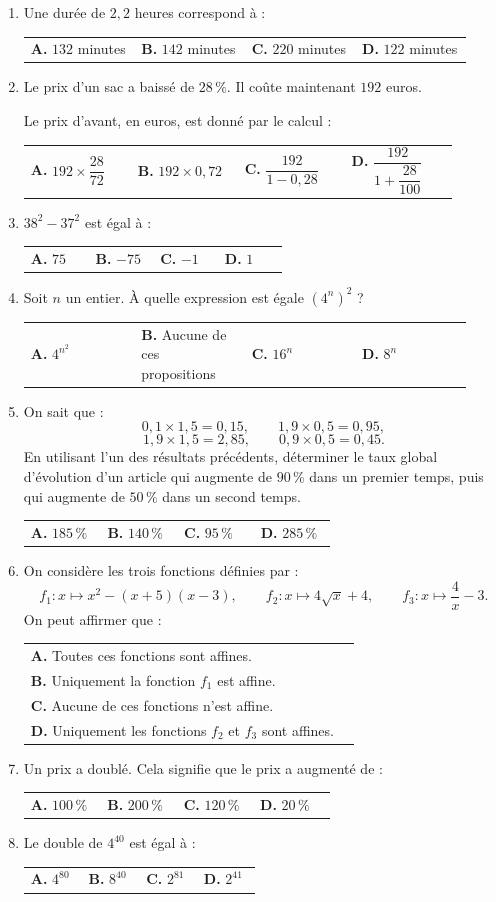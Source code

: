\documentclass[11pt,a4paper]{article}
\makeatletter
\newcommand{\choixquatre}[4]{%
\begin{tabular}{@{}p{0.23\linewidth}p{0.23\linewidth}p{0.23\linewidth}p{0.23\linewidth}@{}}
\textbf{A.} #1 & \textbf{B.} #2 & \textbf{C.} #3 & \textbf{D.} #4
\end{tabular}}
\makeatother
\begin{document}
\begin{enumerate}[label=\textbf{\arabic*)}, leftmargin=0.75cm, itemsep=0.55cm, topsep=0.2cm]

\item Une durée de $2{,}2$ heures correspond à :\par\smallskip
\choixquatre{$132$ minutes}{$142$ minutes}{$220$ minutes}{$122$ minutes}

\item Le prix d'un sac a baissé de $28\,\%$. Il coûte maintenant $192$ euros.\par
Le prix d'avant, en euros, est donné par le calcul :\par\smallskip
\choixquatre{$192\times \dfrac{28}{72}$}{$192\times 0{,}72$}{$\dfrac{192}{1-0{,}28}$}{$\dfrac{192}{1+\dfrac{28}{100}}$}

\item $38^2-37^2$ est égal à :\par\smallskip
\choixquatre{$75$}{$-75$}{$-1$}{$1$}

\item Soit $n$ un entier. À quelle expression est égale $(4^n)^2$ ?\par\smallskip
\choixquatre{$4^{n^2}$}{Aucune de ces propositions}{$16^n$}{$8^n$}

\item On sait que :
\[
0{,}1\times 1{,}5=0{,}15,\qquad 1{,}9\times 0{,}5=0{,}95,
\]
\[
1{,}9\times 1{,}5=2{,}85,\qquad 0{,}9\times 0{,}5=0{,}45.
\]
En utilisant l'un des résultats précédents, déterminer le taux global d'évolution d'un article qui augmente de $90\,\%$ dans un premier temps, puis qui augmente de $50\,\%$ dans un second temps.\par\smallskip
\choixquatre{$185\,\%$}{$140\,\%$}{$95\,\%$}{$285\,\%$}

\item On considère les trois fonctions définies par :
\[
f_1:x\longmapsto x^2-(x+5)(x-3),\qquad
f_2:x\longmapsto 4\sqrt{x}+4,\qquad
f_3:x\longmapsto \frac{4}{x}-3.
\]
On peut affirmer que :\par\smallskip
\begin{tabular}{@{}p{0.96\linewidth}@{}}
\textbf{A.} Toutes ces fonctions sont affines.\\
\textbf{B.} Uniquement la fonction $f_1$ est affine.\\
\textbf{C.} Aucune de ces fonctions n'est affine.\\
\textbf{D.} Uniquement les fonctions $f_2$ et $f_3$ sont affines.
\end{tabular}

\item Un prix a doublé. Cela signifie que le prix a augmenté de :\par\smallskip
\choixquatre{$100\,\%$}{$200\,\%$}{$120\,\%$}{$20\,\%$}

\item Le double de $4^{40}$ est égal à :\par\smallskip
\choixquatre{$4^{80}$}{$8^{40}$}{$2^{81}$}{$2^{41}$}

\end{enumerate}
\end{document}
